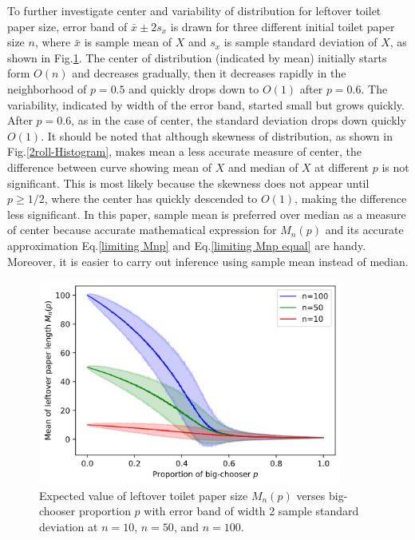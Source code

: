 \documentclass{article}
\begin{document}
To further investigate center and variability of distribution for leftover toilet paper size, error band of $\bar{x} \pm 2s_x$ is drawn for three different initial toilet paper size $n$, where $\bar{x}$ is sample mean of $X$ and $s_x$ is sample standard deviation of $X$, as shown in Fig.\ref{2roll-Mnp}. The center of distribution (indicated by mean) initially starts form $O(n)$ and decreases gradually, then it decreases rapidly in the neighborhood of $p=0.5$ and quickly drops down to $O(1)$ after $p=0.6$. The variability, indicated by width of the error band, started small but grows quickly. After $p=0.6$, as in the case of center, the standard deviation drops down quickly $O(1)$. It should be noted that although skewness of distribution, as shown in Fig.\ref{2roll-Histogram}, makes mean a less accurate measure of center, the difference between curve showing mean of $X$ and median of $X$ at different $p$ is not significant. This is most likely because the skewness does not appear until $p \geq 1/2$, where the center has quickly descended to $O(1)$, making the difference less significant. In this paper, sample mean is preferred over median as a measure of center because accurate mathematical expression for $M_n(p)$ and its accurate approximation Eq.\eqref{limiting Mnp} and Eq.\eqref{limiting Mnp equal} are handy. Moreover, it is easier to carry out inference using sample mean instead of median.
\begin{figure}[ht]
    \centering
    \includegraphics[width=10cm]{Mnp-2roll.png}
    \caption{Expected value of leftover toilet paper size $M_n(p)$ verses big-chooser proportion $p$ with error band of width 2 sample standard deviation at $n=10$, $n=50$, and $n=100$.}
    \label{2roll-Mnp}    
\end{figure}


\end{document}
